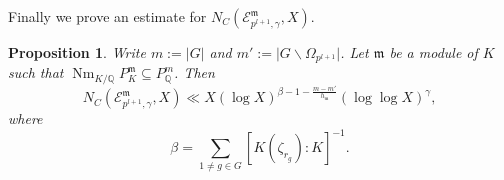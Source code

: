 \documentclass{amsart}
\numberwithin{equation}{section}
\theoremstyle{plain}
\newtheorem{proposition}[theorem]{Proposition}
\theoremstyle{definition}
\theoremstyle{remark}
\begin{document}
Finally we prove an estimate for $N_{C}(\mathcal{E}_{p^{l+1},\gamma}^{\mathfrak{m}},X)$.
\begin{proposition}\label{prop: field-counting of abelian extensions in general}
	Write $m:=\lvert G\rvert$ and $m':=\lvert G\backslash\Omega_{p^{l+1}}\rvert$.
	Let $\mathfrak{m}$ be a module of $K$ such that $\operatorname{Nm}_{K/\mathbb{Q}}P_K^{\mathfrak{m}}\subseteq P_{\mathbb{Q}}^m$.
	Then
	\begin{equation*}
		N_{C}(\mathcal{E}_{p^{l+1},\gamma}^{\mathfrak{m}},X)\ll X(\log X)^{\beta-1-\frac{m-m'}{h_{\mathfrak{m}}}}(\log\log X)^{\gamma},
	\end{equation*}
	where
	\begin{equation*}
		\beta=\sum_{1\neq g\in G}[K(\zeta_{r_g}):K]^{-1}.
	\end{equation*}
\end{proposition}
\end{document}
